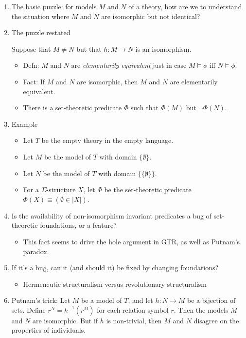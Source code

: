 \documentclass[fleqn]{tufte-handout}
\begin{document}
\begin{enumerate}
\item The basic puzzle: for models $M$ and $N$ of a theory, how are we
  to understand the situation where $M$ and $N$ are isomorphic but not
  identical?

\item The puzzle restated

  Suppose that $M\neq N$ but that $h:M\to N$ is an isomorphism.

  \begin{itemize}
  \item Defn: $M$ and $N$ are \emph{elementarily equivalent} just in
    case $M\vDash \phi$ iff $N\vDash \phi$.
  \item Fact: If $M$ and $N$ are isomorphic, then $M$ and $N$ are
    elementarily equivalent.
  \item There is a set-theoretic predicate $\Phi$ such that $\Phi (M)$
    but $\neg \Phi (N)$.
  \end{itemize}

\item Example
  \begin{itemize}
  \item Let $T$ be the empty theory in the empty language.
  \item Let $M$ be the model of $T$ with domain $\{ \emptyset \}$.
  \item Let $N$ be the model of $T$ with domain
    $\{ \{ \emptyset \} \}$.
  \item For a $\Sigma$-structure $X$, let $\Phi$ be the set-theoretic
    predicate $\Phi (X)\equiv (\emptyset \in |X|)$. \end{itemize}

\item Is the availability of non-isomorphism invariant predicates a
  bug of set-theoretic foundations, or a feature?
    \begin{itemize}
    \item This fact seems to drive the hole argument in GTR, as well
      as Putnam's paradox.
    \end{itemize}
  \item If it's a bug, can it (and should it) be fixed by changing
    foundations?
    \begin{itemize}
    \item Hermeneutic structuralism versus revolutionary structuralism
    \end{itemize}

\item Putnam's trick: Let $M$ be a model of $T$, and let $h:N\to M$ be
  a bijection of sets. Define $r^N=h^{-1}(r^M)$ for each relation
  symbol $r$. Then the models $M$ and $N$ are isomorphic. But if $h$
  is non-trivial, then $M$ and $N$ disagree on the properties of
  individuals.


\end{enumerate}
\end{document}
